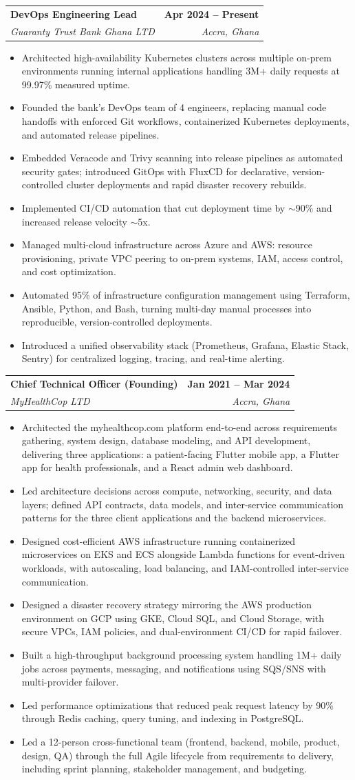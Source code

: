 \documentclass[letterpaper,11pt]{article}
\makeatletter
\newcommand{\resumeItem}[1]{
  \item\small{
    {#1 \vspace{-3pt}}
  }
}
\newcommand{\resumeSubheading}[4]{
  \vspace{-3pt}\item
    \begin{tabular*}{1.0\textwidth}[t]{l@{\extracolsep{\fill}}r}
      \textbf{#1} & \textbf{\small #2} \\
      \textit{\small#3} & \textit{\small #4} \\
    \end{tabular*}\vspace{-7pt}
}
\newcommand{\resumeItemListStart}{\begin{itemize}}
\newcommand{\resumeItemListEnd}{\end{itemize}\vspace{0pt}}
\makeatother
\begin{document}
    \resumeSubheading
      {DevOps Engineering Lead}{Apr 2024 -- Present}
      {Guaranty Trust Bank Ghana LTD}{Accra, Ghana}
      \resumeItemListStart
        \resumeItem{Architected high-availability Kubernetes clusters across multiple on-prem environments running internal applications handling 3M+ daily requests at 99.97\% measured uptime.}
        \resumeItem{Founded the bank's DevOps team of 4 engineers, replacing manual code handoffs with enforced Git workflows, containerized Kubernetes deployments, and automated release pipelines.}
        \resumeItem{Embedded Veracode and Trivy scanning into release pipelines as automated security gates; introduced GitOps with FluxCD for declarative, version-controlled cluster deployments and rapid disaster recovery rebuilds.}
        \resumeItem{Implemented CI/CD automation that cut deployment time by $\sim$90\% and increased release velocity $\sim$5x.}
        \resumeItem{Managed multi-cloud infrastructure across Azure and AWS: resource provisioning, private VPC peering to on-prem systems, IAM, access control, and cost optimization.}
        \resumeItem{Automated 95\% of infrastructure configuration management using Terraform, Ansible, Python, and Bash, turning multi-day manual processes into reproducible, version-controlled deployments.}
        \resumeItem{Introduced a unified observability stack (Prometheus, Grafana, Elastic Stack, Sentry) for centralized logging, tracing, and real-time alerting.}
      \resumeItemListEnd

    \resumeSubheading
      {Chief Technical Officer (Founding)}{Jan 2021 -- Mar 2024}
      {MyHealthCop LTD}{Accra, Ghana}
      \resumeItemListStart
        \resumeItem{Architected the myhealthcop.com platform end-to-end across requirements gathering, system design, database modeling, and API development, delivering three applications: a patient-facing Flutter mobile app, a Flutter app for health professionals, and a React admin web dashboard.}
        \resumeItem{Led architecture decisions across compute, networking, security, and data layers; defined API contracts, data models, and inter-service communication patterns for the three client applications and the backend microservices.}
        \resumeItem{Designed cost-efficient AWS infrastructure running containerized microservices on EKS and ECS alongside Lambda functions for event-driven workloads, with autoscaling, load balancing, and IAM-controlled inter-service communication.}
        \resumeItem{Designed a disaster recovery strategy mirroring the AWS production environment on GCP using GKE, Cloud SQL, and Cloud Storage, with secure VPCs, IAM policies, and dual-environment CI/CD for rapid failover.}
        \resumeItem{Built a high-throughput background processing system handling 1M+ daily jobs across payments, messaging, and notifications using SQS/SNS with multi-provider failover.}
        \resumeItem{Led performance optimizations that reduced peak request latency by 90\% through Redis caching, query tuning, and indexing in PostgreSQL.}
        \resumeItem{Led a 12-person cross-functional team (frontend, backend, mobile, product, design, QA) through the full Agile lifecycle from requirements to delivery, including sprint planning, stakeholder management, and budgeting.}
      \resumeItemListEnd
\end{document}
